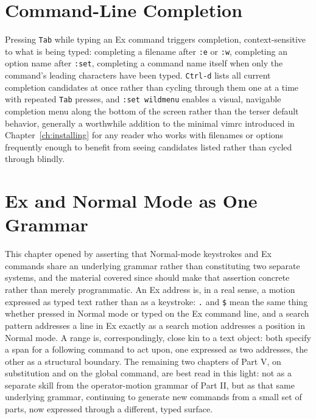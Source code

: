 \section{Command-Line Completion}

Pressing \texttt{Tab} while typing an Ex command triggers completion, context-sensitive to what is being typed: completing a filename after \texttt{:e} or \texttt{:w}, completing an option name after \texttt{:set}, completing a command name itself when only the command's leading characters have been typed. \texttt{Ctrl-d} lists all current completion candidates at once rather than cycling through them one at a time with repeated \texttt{Tab} presses, and \texttt{:set wildmenu} enables a visual, navigable completion menu along the bottom of the screen rather than the terser default behavior, generally a worthwhile addition to the minimal vimrc introduced in Chapter~\ref{ch:installing} for any reader who works with filenames or options frequently enough to benefit from seeing candidates listed rather than cycled through blindly.

\section{Ex and Normal Mode as One Grammar}

This chapter opened by asserting that Normal-mode keystrokes and Ex commands share an underlying grammar rather than constituting two separate systems, and the material covered since should make that assertion concrete rather than merely programmatic. An Ex address is, in a real sense, a motion expressed as typed text rather than as a keystroke: \texttt{.} and \texttt{\$} mean the same thing whether pressed in Normal mode or typed on the Ex command line, and a search pattern addresses a line in Ex exactly as a search motion addresses a position in Normal mode. A range is, correspondingly, close kin to a text object: both specify a span for a following command to act upon, one expressed as two addresses, the other as a structural boundary. The remaining two chapters of Part V, on substitution and on the global command, are best read in this light: not as a separate skill from the operator-motion grammar of Part II, but as that same underlying grammar, continuing to generate new commands from a small set of parts, now expressed through a different, typed surface.
